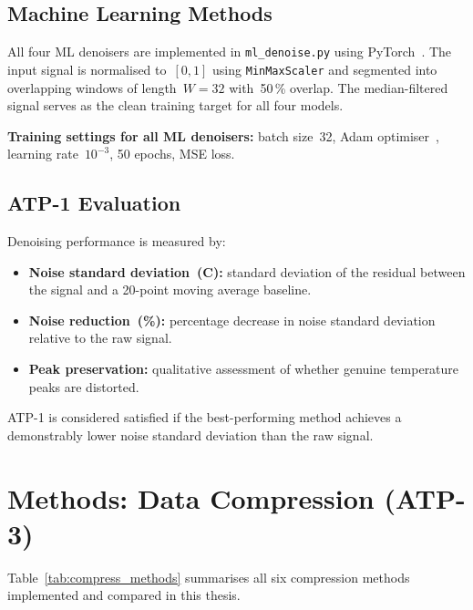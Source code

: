 \subsection{Machine Learning Methods}

All four ML denoisers are implemented in \texttt{ml\_denoise.py} using PyTorch~\cite{pytorch}. The input signal is normalised to~$[0,1]$ using \texttt{MinMaxScaler} and segmented into overlapping windows of length~$W=32$ with~50\,\% overlap. The median-filtered signal serves as the clean training target for all four models.

\textbf{Training settings for all ML denoisers:} batch size~32, Adam optimiser~\cite{kingma2014adam}, learning rate~$10^{-3}$, 50 epochs, MSE loss.

\subsection{ATP-1 Evaluation}

Denoising performance is measured by:
\begin{itemize}[leftmargin=2em, nosep]
\item \textbf{Noise standard deviation~(C):} standard deviation of the residual between the signal and a 20-point moving average baseline.
\item \textbf{Noise reduction~(\%):} percentage decrease in noise standard deviation relative to the raw signal.
\item \textbf{Peak preservation:} qualitative assessment of whether genuine temperature peaks are distorted.
\end{itemize}

ATP-1 is considered satisfied if the best-performing method achieves a demonstrably lower noise standard deviation than the raw signal.

\section{Methods: Data Compression (ATP-3)}
\label{sec:method_compress}

Table~\ref{tab:compress_methods} summarises all six compression methods implemented and compared in this thesis.

